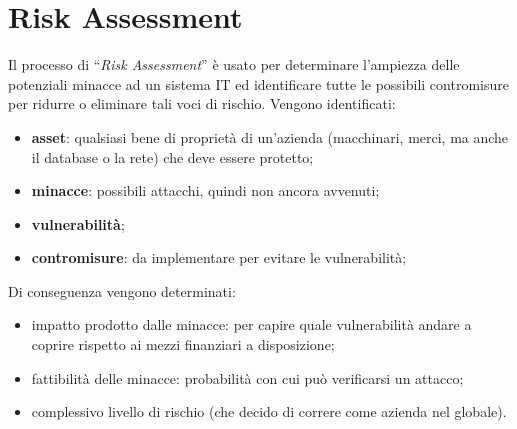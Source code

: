 \section{Risk Assessment}

Il processo di “\textit{Risk Assessment}” è usato per determinare l'ampiezza
delle potenziali minacce ad un sistema IT ed identificare tutte le possibili
contromisure per ridurre o eliminare tali voci di rischio.
Vengono identificati:

\begin{itemize}
    \item \textbf{asset}: qualsiasi bene di proprietà di un'azienda
          (macchinari, merci, ma anche il database o
          la rete) che deve essere protetto;
    \item \textbf{minacce}: possibili attacchi, quindi non ancora avvenuti;
    \item \textbf{vulnerabilità};
    \item \textbf{contromisure}: da implementare per evitare le vulnerabilità;
\end{itemize}

Di conseguenza vengono determinati:

\begin{itemize}
    \item impatto prodotto dalle minacce: per capire quale vulnerabilità
          andare a coprire rispetto ai
          mezzi finanziari a disposizione;
    \item fattibilità delle minacce: probabilità con cui può verificarsi
          un attacco;
    \item complessivo livello di rischio
          (che decido di correre come azienda nel globale).
\end{itemize}
